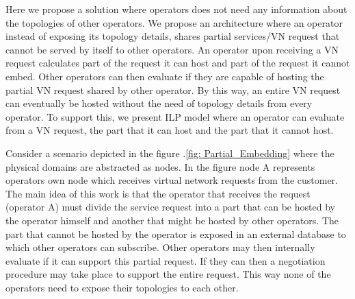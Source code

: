 \documentclass[article,dr=phil,type=msc ,colorback,accentcolor=tud4b]{tudthesis}
\begin{document}
Here we propose a solution where operators does not need any information about the topologies of other operators. We propose an architecture where an operator instead of exposing its topology details, shares partial services/VN request that cannot be served by itself to other operators. An operator upon receiving a VN request calculates part of the request it can host and part of the request it cannot embed. Other operators can then evaluate if they are capable of hosting the partial VN request shared by other operator. By this way, an entire VN request can eventually be hosted without the need of topology details from every operator. To support this, we present ILP model where an operator can evaluate from a VN request, the part that it can host and the part that it cannot host.\newline

Consider a scenario depicted in the figure .\ref{fig: Partial_Embedding} where the physical domains are abstracted as nodes. In the figure node A represents operators own node which receives virtual network requests from the customer. The main idea of this work is that the operator that receives the request (operator A) must  divide the service request into a part that can be hosted by the operator himself and another that might be hosted by other  operators. The part that cannot be hosted by the operator is exposed in an external database to which other operators can subscribe. Other operators may then internally evaluate if it can support this partial request. If they can then a negotiation procedure may take place to support the entire request. This way none of the operators need to expose their topologies to each other.\newline
\end{document}
